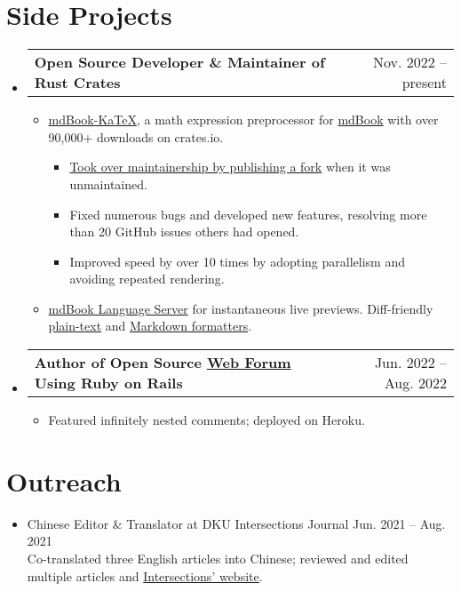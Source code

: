 \documentclass[letterpaper,11pt]{article}
\makeatletter
\newcommand{\CVItem}[1]{
  \item{\small
    {#1 \vspace{-2pt}}
  }
}
\newcommand{\CVSubheadingFrame}[1]{
  \vspace{-2pt}\item
    \begin{tabular*}{0.97\textwidth}[t]{l@{\extracolsep{\fill}}r}
        #1
    \end{tabular*}\vspace{-7pt}
}
\newcommand{\CVSubHeadingListStart}{\begin{itemize}[leftmargin=0.5cm, label={}]}
\newcommand{\CVSubHeadingListEnd}{\end{itemize}}
\newcommand{\CVItemListStart}{\begin{itemize}}
\newcommand{\CVItemListEnd}{\end{itemize}\vspace{-5pt}}
\newcommand{\uhref}[2]{\href{#1}{\textcolor{darkbluepurple}{#2}}}
\makeatother
\begin{document}
\section{Side Projects}
\CVSubHeadingListStart
\CVSubheadingFrame
{\textbf{Open Source Developer \& Maintainer of Rust Crates}&
    Nov. 2022 -- present
}
\CVItemListStart
\CVItem
{\uhref{https://github.com/lzanini/mdbook-katex}{mdBook-KaTeX}, a math expression preprocessor for
    \uhref{https://github.com/rust-lang/mdBook}{mdBook} with
    over 90,000+ downloads on crates.io.
    \begin{itemize}
        \item \uhref{https://github.com/lzanini/mdbook-KaTeX/issues/37}
        {Took over maintainership by publishing a fork} when
        it was unmaintained.

        \item Fixed numerous bugs and developed new features,
        resolving more than 20 GitHub issues others had opened.

        \item Improved speed by over 10 times by adopting parallelism and
        avoiding repeated rendering.

    \end{itemize}
}
\CVItem
{\uhref{https://github.com/SichangHe/mdbook_ls}{mdBook Language Server} for
    instantaneous live previews.
    Diff-friendly \uhref{https://github.com/SichangHe/fmtt}{plain-text} and
    \uhref{https://github.com/SichangHe/fmtm}{Markdown formatters}.
}
\CVItemListEnd

\CVSubheadingFrame
{\textbf{Author of Open Source \uhref{https://github.com/SichangHe/rails_forum}
        {Web Forum} Using Ruby on Rails}&
    Jun. 2022 -- Aug. 2022
}
\CVItemListStart
\CVItem
{Featured infinitely nested comments;
    deployed on Heroku.
}
\CVItemListEnd
\CVSubHeadingListEnd

\section{Outreach}
\begin{itemize}
    \item Chinese Editor \& Translator at DKU Intersections Journal\hfill
    Jun. 2021 -- Aug. 2021\\{\small
    Co-translated three English articles into Chinese;
    reviewed and edited multiple articles and
    \uhref{https://sites.duke.edu/intersections/}{Intersections' website}.
    }
    \vspace{-4pt}
\end{itemize}
\end{document}
